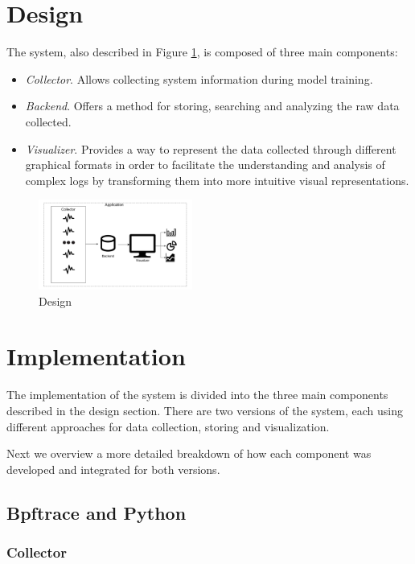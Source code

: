 \documentclass[conference]{IEEEtran}
\begin{document}
\section{Design}
The system, also described in Figure \ref{fig:Design}, is composed of three main components:
\begin{itemize}
	\item \textit{Collector}. Allows collecting system information during model training.
	\item \textit{Backend}. Offers a method for storing, searching and analyzing the raw data collected.
	\item \textit{Visualizer}. Provides a way to represent the data collected through different graphical formats in order to facilitate the understanding and analysis of complex logs by transforming them into more intuitive visual representations.
\end{itemize}

\begin{figure}[htbp]
	\centering
	\includegraphics[width=0.45\textwidth]{images/DesignPIV3.pdf}
	\caption{Design}
	\label{fig:Design}
\end{figure}

\section{Implementation}
The implementation of the system is divided into the three main components described in the design section.
There are two versions of the system, each using different approaches for data collection, storing and visualization.

Next we overview a more detailed breakdown of how each component was developed and integrated for both versions.

\subsection{Bpftrace and Python}

\subsubsection{Collector}
\end{document}
